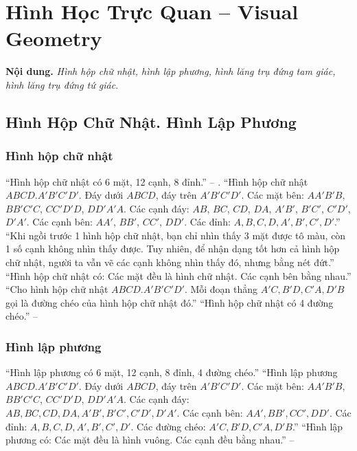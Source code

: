 \documentclass{article}
\numberwithin{equation}{section}
\begin{document}

\section{Hình Học Trực Quan -- Visual Geometry}
\textbf{Nội dung.} \textit{Hình hộp chữ nhật, hình lập phương, hình lăng trụ đứng tam giác, hình lăng trụ đứng tứ giác}.

\subsection{Hình Hộp Chữ Nhật. Hình Lập Phương}

\subsubsection{Hình hộp chữ nhật}
``Hình hộp chữ nhật có 6 mặt, 12 cạnh, 8 đỉnh.'' -- \cite[p. 76]{SGK_Toan_7_Canh_Dieu_tap_1}. ``Hình hộp chữ nhật $ABCD.A'B'C'D'$. Đáy dưới $ABCD$, đáy trên $A'B'C'D'$. Các mặt bên: $AA'B'B$, $BB'C'C$, $CC'D'D$, $DD'A'A$. Các cạnh đáy: $AB$, $BC$, $CD$, $DA$, $A'B'$, $B'C'$, $C'D'$, $D'A'$. Các cạnh bên: $AA'$, $BB'$, $CC'$, $DD'$. Các đỉnh: $A,B,C,D,A',B',C',D'$.'' ``Khi ngồi trước 1 hình hộp chữ nhật, bạn chỉ nhìn thấy 3 mặt được tô màu, còn 1 số cạnh không nhìn thấy được. Tuy nhiên, để nhận dạng tốt hơn cả hình hộp chữ nhật, người ta vẫn vẽ các cạnh không nhìn thấy đó, nhưng bằng nét đứt.'' ``Hình hộp chữ nhật có: Các mặt đều là hình chữ nhật. Các cạnh bên bằng nhau.'' ``Cho hình hộp chữ nhật $ABCD.A'B'C'D'$. Mỗi đoạn thẳng $A'C,B'D,C'A,D'B$ gọi là đường chéo của hình hộp chữ nhật đó.'' ``Hình hộp chữ nhật có 4 đường chéo.'' -- \cite[p. 77]{SGK_Toan_7_Canh_Dieu_tap_1}

\subsubsection{Hình lập phương}
``Hình lập phương có 6 mặt, 12 cạnh, 8 đỉnh, 4 đường chéo.'' ``Hình lập phương $ABCD.A'B'C'D'$. Đáy dưới $ABCD$, đáy trên $A'B'C'D'$. Các mặt bên: $AA'B'B$, $BB'C'C$, $CC'D'D$, $DD'A'A$. Các cạnh đáy: $AB,BC,CD,DA,A'B',B'C',C'D',D'A'$. Các cạnh bên: $AA',BB',CC',DD'$. Các đỉnh: $A,B,C,D,A',B',C',D'$. Các đường chéo: $A'C,B'D,C'A,D'B$.'' ``Hình lập phương có: Các mặt đều là hình vuông. Các cạnh đều bằng nhau.'' -- \cite[p. 78]{SGK_Toan_7_Canh_Dieu_tap_1}
\end{document}
